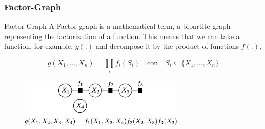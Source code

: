     \begin{frame}
    \frametitle{Factor-Graph}
    
    \begin{block}{Factor-Graph}
    A Factor-graph is a mathematical term, a bipartite graph representing the factorization of a function. This means that we can take a function, for example, $g(.)$ and decompose it by the product of functions $f(.)$,
    
    \begin{equation*}
    g(X_{1}, \dots, X_{n}) = \prod_{i} f_{i}(S_{i}) \quad \text{con} \quad S_{i} \subseteq \{ X_{1},\dots, X_{n} \}
    \end{equation*}
    \end{block}
    
    \begin{figure}[!h]
    \includegraphics[width=0.7\textwidth]{images/factor_graph_example.pdf}
    \end{figure}
    
    
    \end{frame}
    

